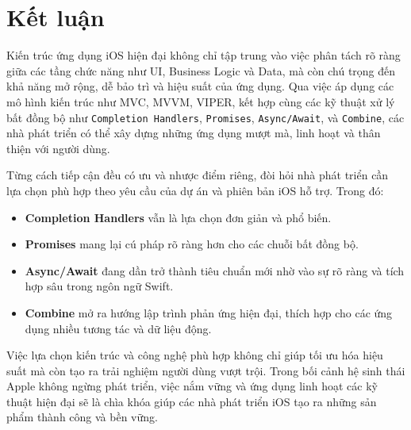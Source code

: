 \section{Kết luận}

Kiến trúc ứng dụng iOS hiện đại không chỉ tập trung vào việc phân tách rõ ràng giữa các tầng chức năng như UI, Business Logic và Data, mà còn chú trọng đến khả năng mở rộng, dễ bảo trì và hiệu suất của ứng dụng. Qua việc áp dụng các mô hình kiến trúc như MVC, MVVM, VIPER, kết hợp cùng các kỹ thuật xử lý bất đồng bộ như \texttt{Completion Handlers}, \texttt{Promises}, \texttt{Async/Await}, và \texttt{Combine}, các nhà phát triển có thể xây dựng những ứng dụng mượt mà, linh hoạt và thân thiện với người dùng.

Từng cách tiếp cận đều có ưu và nhược điểm riêng, đòi hỏi nhà phát triển cần lựa chọn phù hợp theo yêu cầu của dự án và phiên bản iOS hỗ trợ. Trong đó:
\begin{itemize}
    \item \textbf{Completion Handlers} vẫn là lựa chọn đơn giản và phổ biến.
    \item \textbf{Promises} mang lại cú pháp rõ ràng hơn cho các chuỗi bất đồng bộ.
    \item \textbf{Async/Await} đang dần trở thành tiêu chuẩn mới nhờ vào sự rõ ràng và tích hợp sâu trong ngôn ngữ Swift.
    \item \textbf{Combine} mở ra hướng lập trình phản ứng hiện đại, thích hợp cho các ứng dụng nhiều tương tác và dữ liệu động.
\end{itemize}

Việc lựa chọn kiến trúc và công nghệ phù hợp không chỉ giúp tối ưu hóa hiệu suất mà còn tạo ra trải nghiệm người dùng vượt trội. Trong bối cảnh hệ sinh thái Apple không ngừng phát triển, việc nắm vững và ứng dụng linh hoạt các kỹ thuật hiện đại sẽ là chìa khóa giúp các nhà phát triển iOS tạo ra những sản phẩm thành công và bền vững.

